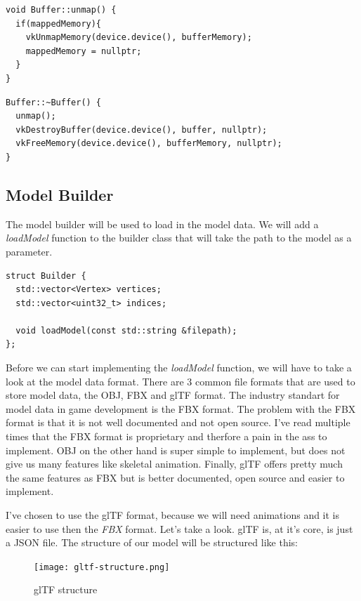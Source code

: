 \documentclass[12pt]{report} \usepackage{preamble}
\begin{document}
\begin{lstlisting}[Language=C++]
void Buffer::unmap() {
  if(mappedMemory){
    vkUnmapMemory(device.device(), bufferMemory);
    mappedMemory = nullptr;
  }
}
\end{lstlisting}

\begin{lstlisting}[Language=C++]
Buffer::~Buffer() {
  unmap();
  vkDestroyBuffer(device.device(), buffer, nullptr);
  vkFreeMemory(device.device(), bufferMemory, nullptr);
}
\end{lstlisting}

\subsection{Model Builder}

The model builder will be used to load in the model data. We will add a \textit{loadModel} function to the builder class that will take the path to the model as a parameter.

\begin{lstlisting}[Language=C++]
struct Builder {
  std::vector<Vertex> vertices;
  std::vector<uint32_t> indices;

  void loadModel(const std::string &filepath);
};
\end{lstlisting}

Before we can start implementing the \textit{loadModel} function, we will have to take a look at the model data format.
There are 3 common file formats that are used to store model data, the \ac{OBJ}, \ac{FBX} and \ac{glTF} format.
The industry standart for model data in game development is the \ac{FBX} format. The problem with the \ac{FBX} format is that
it is not well documented and not open source. I've read multiple times that the \ac{FBX} format is  proprietary and therfore a
pain in the ass to implement. \ac{OBJ} on the other hand is super simple to implement, but does not give us many features
like skeletal animation. Finally, \ac{glTF} offers pretty much the same features as \ac{FBX} but is better documented,
open source and easier to implement.

I've chosen to use the \ac{glTF} format, because we will need animations and it is easier to use then the \textit{FBX}
format. Let's take a look. \ac{glTF} is, at it's core, is just a JSON file. The structure of our model will be
structured like this:

\begin{figure}[hbtp]
	\centering \texttt{[image: gltf-structure.png]}
	\caption{glTF structure}
\end{figure} \FloatBarrier
\end{document}
